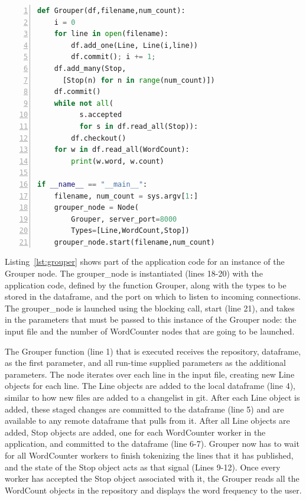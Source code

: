 \begin{lstlisting}[language=Python,basicstyle=\small, numbers=left, 
label=lst:grouper, captionpos=b, caption=The Grouper node.]
def Grouper(df,filename,num_count):
    i = 0
    for line in open(filename):
        df.add_one(Line, Line(i,line))
        df.commit(); i += 1;
    df.add_many(Stop,
      [Stop(n) for n in range(num_count)])
    df.commit()
    while not all(
          s.accepted
          for s in df.read_all(Stop)):
        df.checkout()
    for w in df.read_all(WordCount):
        print(w.word, w.count)
        
if __name__ == "__main__":
    filename, num_count = sys.argv[1:]
    grouper_node = Node(
        Grouper, server_port=8000
        Types=[Line,WordCount,Stop])
    grouper_node.start(filename,num_count)
\end{lstlisting}

Listing~\ref{lst:grouper} shows part of the application code for an instance of the Grouper node. The grouper\_node is instantiated (lines 18-20) with the application code, defined by the function Grouper, along with the types to be stored in the dataframe, and the port on which to listen to incoming connections. The grouper\_node is launched using the blocking call, start (line 21), and takes in the parameters that must be passed to this instance of the Grouper node: the input file and the number of WordCounter nodes that are going to be launched. 

The Grouper function  (line 1) that is executed receives the repository, dataframe, as the first parameter, and all run-time supplied parameters as the additional parameters. The node iterates over each line in the input file, creating new Line objects for each line. The Line objects are added to the local dataframe (line 4), similar to how new files are added to a changelist in git. After each Line object is added, these staged changes are committed to the dataframe (line 5) and are available to any remote dataframe that pulls from it. After all Line objects are added, Stop objects are added, one for each WordCounter worker in the application, and committed to the dataframe (line 6-7). Grouper now has to wait for all WordCounter workers to finish tokenizing the lines that it has published, and the state of the Stop object acts as that signal (Lines 9-12). Once every worker has accepted the Stop object associated with it, the Grouper reads all the WordCount objects in the repository and displays the word frequency to the user.

